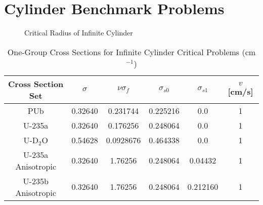 \section{Cylinder Benchmark Problems}

\begin{figure}[!htbp]
	\centering
	
	\caption{Critical Radius of Infinite Cylinder}
	\label{fig:CylCritRadius}
\end{figure}

\begin{table}[!htbp]
	\caption{One-Group Cross Sections for Infinite Cylinder Critical Problems (cm$^{-1}$) \cite{sood2003analytical}}
	\label{table:SoodCyl}
	\centering{}
    \begin{tabular}{*6c}
        \toprule
	Cross Section Set & $\sigma$ & $\nu \sigma_{f}$ & $\sigma_{s0}$ & $\sigma_{s1}$ & $v$ [cm/s] \\ 
        \midrule
	PUb & 0.32640 & 0.231744 & 0.225216 & 0.0 & 1 \\
	U-235a & 0.32640 & 0.176256 & 0.248064 & 0.0 & 1 \\
	U-D$_{2}$O & 0.54628 & 0.0928676 & 0.464338 & 0.0 & 1 \\
	U-235a Anisotropic & 0.32640 & 1.76256 & 0.248064 & 0.04432 & 1 \\
	U-235b Anisotropic & 0.32640 & 1.76256 & 0.248064 & 0.212160 & 1 \\
        \bottomrule
    \end{tabular}
\end{table}

